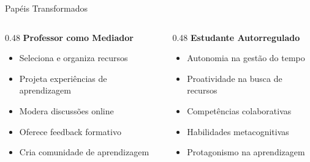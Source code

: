 \documentclass[aspectratio=169,xcolor=table]{beamer}
\begin{document}
\begin{frame}{Papéis Transformados}
    \begin{columns}[T]
        \begin{column}{0.48\textwidth}
            \textbf{Professor como Mediador}
            \begin{itemize}
                \item Seleciona e organiza recursos
                \item Projeta experiências de aprendizagem
                \item Modera discussões online
                \item Oferece feedback formativo
                \item Cria comunidade de aprendizagem
            \end{itemize}
        \end{column}
        \begin{column}{0.48\textwidth}
            \textbf{Estudante Autorregulado}
            \begin{itemize}
                \item Autonomia na gestão do tempo
                \item Proatividade na busca de recursos
                \item Competências colaborativas
                \item Habilidades metacognitivas
                \item Protagonismo na aprendizagem
            \end{itemize}
        \end{column}
    \end{columns}
\end{frame}
\end{document}
